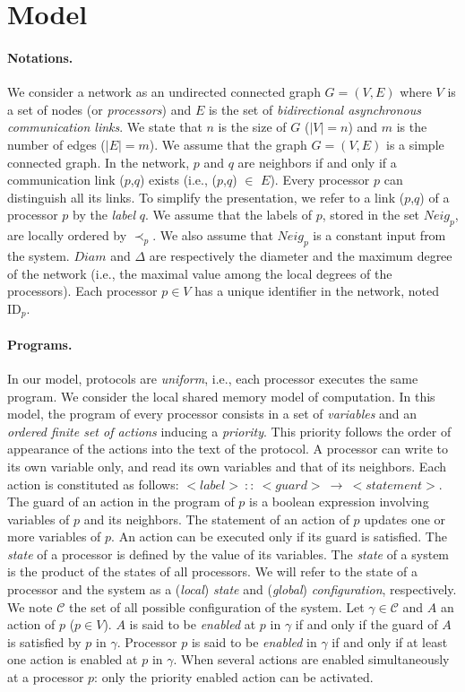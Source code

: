\documentclass[11pt,letterpaper,onecolumn]{article}
\newcommand{\id}{\mbox{ID}}
\begin{document}
\section{Model}
\label{sec:model}

\paragraph{Notations.}
We consider a network as an undirected connected graph $G=(V,E)$ where $V$ is a set of nodes (or {\em processors}) and $E$ is the set of {\em bidirectional asynchronous communication links}. We state that $n$ is the size of $G$ ($|V| = n$) and $m$ is the number of edges ($|E| = m$). We assume that the graph $G=(V,E)$ is a simple connected graph. In the network, $p$ and $q$ are neighbors if and only if a communication link ($p$,$q$) exists (i.e., ($p$,$q$) $\in$ $E$). Every processor $p$ can distinguish all its links. To simplify the presentation, we refer to a link ($p$,$q$) of a processor $p$ by the {\em label} $q$. We assume that the labels of $p$, stored in the set $Neig_p$, are locally ordered by $\prec_p$. We also assume that $Neig_p$ is a constant input from the system. $Diam$ and $\Delta$ are respectively the diameter and the maximum degree of the network (i.e., the maximal value among the local degrees of the processors). Each processor $p \in V$ has a unique identifier in the network, noted $\id_p$.

\paragraph{Programs.}In our model, protocols are {\em uniform}, i.e., each processor executes the same program. We consider the local shared memory model of computation. In this model, the program of every processor consists in a set of {\em variables} and an {\em ordered finite set of actions} inducing a {\em priority}. This priority follows the order of appearance of the actions into the text of the protocol. A processor can write to its own variable only, and read its own variables and that of its neighbors. Each action is constituted as follows: $<label>\ ::\ <guard>\ \to \ <statement>.$ The guard of an action in the program of $p$ is a boolean expression involving variables of $p$ and its neighbors. The statement of an action of $p$ updates one or more variables of $p$. An action can be executed only if its guard is satisfied. The {\em state} of a processor is defined by the value of its variables. The {\em state} of a system is the product of the states of all processors. We will refer to the state of 
a processor and the system as a ({\em local}) {\em state} and ({\em global}) {\em configuration}, respectively. We note $\mathcal C$ the set of all possible configuration of the system. Let $\gamma \in \mathcal C$ and $A$ an action of $p$ ($p \in V$). $A$ is said to be {\em enabled} at $p$ in $\gamma$ if and only if the guard of $A$ is satisfied by $p$ in $\gamma$. Processor $p$ is said to be {\em enabled} in $\gamma$ if and only if at least one action is enabled at $p$ in $\gamma$. When several actions are enabled simultaneously at a processor $p$: only the priority enabled action can be activated.
\end{document}
